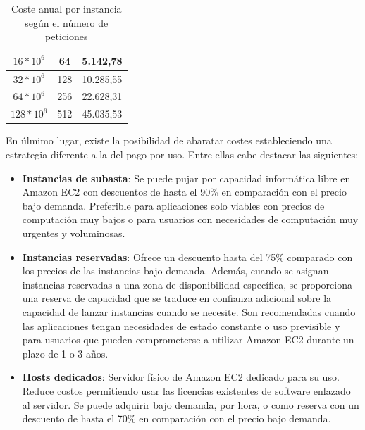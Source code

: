\begin{table}
\begin{center}
\begin{tabular}{ccc}
\multicolumn{1}{|c|}{$16 * 10^6$}                                      & \multicolumn{1}{c|}{64}                                                                                                        & \multicolumn{1}{c|}{5.142,78}                                                                                 \\ \hline
\multicolumn{1}{|c|}{$32 * 10^6$}                                      & \multicolumn{1}{c|}{128}                                                                                                       & \multicolumn{1}{c|}{10.285,55}                                                                                \\ \hline
\multicolumn{1}{|c|}{$64 * 10^6$}                                      & \multicolumn{1}{c|}{256}                                                                                                       & \multicolumn{1}{c|}{22.628,31}                                                                                \\ \hline
\multicolumn{1}{|c|}{$128 * 10^6$}                                     & \multicolumn{1}{c|}{512}                                                                                                       & \multicolumn{1}{c|}{45.035,53} \\ \hline
\end{tabular}
\caption{Coste anual por instancia según el número de peticiones \label{tab:costepeticiones}}
\end{center}
\end{table}

En úlmimo lugar, existe la posibilidad de abaratar costes estableciendo una estrategia diferente a la del pago por uso. Entre ellas cabe destacar las siguientes:
\begin{itemize}
\item \textbf{Instancias de subasta}: Se puede pujar por capacidad informática libre en Amazon EC2 con descuentos de hasta el 90\% en comparación con el precio bajo demanda. Preferible para  aplicaciones solo viables con precios de computación muy bajos o para usuarios con necesidades de computación muy urgentes y voluminosas.
\item \textbf{Instancias reservadas}: Ofrece un descuento hasta del 75\% comparado con los precios de las instancias bajo demanda. Además, cuando se asignan instancias reservadas a una zona de disponibilidad específica, se proporciona una reserva de capacidad que se traduce en confianza adicional sobre la capacidad de lanzar instancias cuando se necesite. Son recomendadas cuando las aplicaciones tengan necesidades de estado constante o uso previsible y para usuarios que pueden comprometerse a utilizar Amazon EC2 durante un plazo de 1 o 3 años.
\item \textbf{Hosts dedicados}: Servidor físico de Amazon EC2 dedicado para su uso. Reduce costos permitiendo usar las licencias existentes de software enlazado al servidor. Se puede adquirir bajo demanda, por hora, o como reserva con un descuento de hasta el 70\% en comparación con el precio bajo demanda.
\end{itemize}